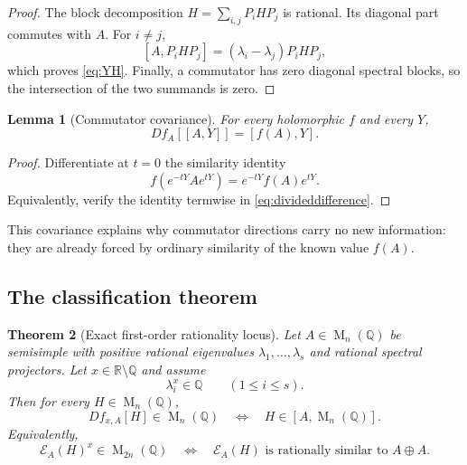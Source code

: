 \documentclass[11pt,oneside]{article}
\newtheorem{theorem}{Theorem}[section]
\newtheorem{lemma}[theorem]{Lemma}
\theoremstyle{definition}
\theoremstyle{remark}
\newcommand{\Q}{\mathbb Q}
\newcommand{\R}{\mathbb R}
\newcommand{\Mat}{\operatorname{M}}
\newcommand{\cE}{\mathcal E}
\begin{document}
\begin{proof}
The block decomposition $H=\sum_{i,j}P_iHP_j$ is rational.  Its diagonal part commutes with
$A$.  For $i\ne j$,
\[
 [A,P_iHP_j]=(\lambda_i-\lambda_j)P_iHP_j,
\]
which proves \eqref{eq:YH}.  Finally, a commutator has zero diagonal spectral blocks, so the
intersection of the two summands is zero.
\end{proof}

\begin{lemma}[Commutator covariance]
\label{lem:commutatorcovariance}
For every holomorphic $f$ and every $Y$,
\begin{equation}
 Df_A[[A,Y]]=[f(A),Y].
 \label{eq:commutatorcovariance}
\end{equation}
\end{lemma}

\begin{proof}
Differentiate at $t=0$ the similarity identity
\[
 f(e^{-tY}Ae^{tY})=e^{-tY}f(A)e^{tY}.
\]
Equivalently, verify the identity termwise in \eqref{eq:divideddifference}.
\end{proof}

This covariance explains why commutator directions carry no new information: they are already
forced by ordinary similarity of the known value $f(A)$.

\subsection{The classification theorem}

\begin{theorem}[Exact first-order rationality locus]
\label{thm:rationalitylocus}
Let $A\in\Mat_n(\Q)$ be semisimple with positive rational eigenvalues
$\lambda_1,\dots,\lambda_s$ and rational spectral projectors.  Let $x\in\R\setminus\Q$ and
assume
\begin{equation}
 \lambda_i^x\in\Q\qquad(1\le i\le s).
 \label{eq:rationalspectralvalues}
\end{equation}
Then for every $H\in\Mat_n(\Q)$,
\begin{equation}
 Df_{x,A}[H]\in\Mat_n(\Q)
 \quad\Longleftrightarrow\quad
 H\in[A,\Mat_n(\Q)].
 \label{eq:rationalityiffcommutator}
\end{equation}
Equivalently,
\begin{equation}
 \cE_A(H)^x\in\Mat_{2n}(\Q)
 \quad\Longleftrightarrow\quad
 \cE_A(H)\text{ is rationally similar to }A\oplus A.
 \label{eq:blockrationalityiffsplit}
\end{equation}
\end{theorem}
\end{document}
